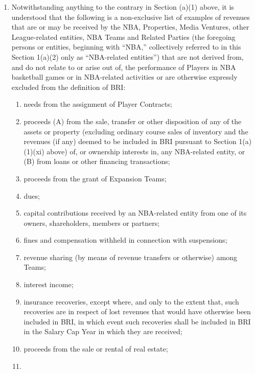 \documentclass[
]{book}
\providecommand{\tightlist}{%
  \setlength{\itemsep}{0pt}\setlength{\parskip}{0pt}}
\begin{document}
\begin{enumerate}
\begin{enumerate}
\begin{enumerate}
    \end{enumerate}
  \item
    Notwithstanding anything to the contrary in Section (a)(1) above, it is understood that the following is a non-exclusive list of examples of revenues that are or may be received by the NBA, Properties, Media Ventures, other League-related entities, NBA Teams and Related Parties (the foregoing persons or entities, beginning with ``NBA,'' collectively referred to in this Section 1(a)(2) only as ``NBA-related entities'') that are not derived from, and do not relate to or arise out of, the performance of Players in NBA basketball games or in NBA-related activities or are otherwise expressly excluded from the definition of BRI:

    \begin{enumerate}
    \def\labelenumiii{(\roman{enumiii})}
    \tightlist
    \item
      needs from the assignment of Player Contracts;
    \item
      proceeds (A) from the sale, transfer or other disposition of any of the assets or property (excluding ordinary course sales of inventory and the revenues (if any) deemed to be included in BRI pursuant to Section 1(a)(1)(xi) above) of, or ownership interests in, any NBA-related entity, or (B) from loans or other financing transactions;
    \item
      proceeds from the grant of Expansion Teams;
    \item
      dues;
    \item
      capital contributions received by an NBA-related entity from one of its owners, shareholders, members or partners;
    \item
      fines and compensation withheld in connection with suspensions;
    \item
      revenue sharing (by means of revenue transfers or otherwise) among Teams;
    \item
      interest income;
    \item
      insurance recoveries, except where, and only to the extent that, such recoveries are in respect of lost revenues that would have otherwise been included in BRI, in which event such recoveries shall be included in BRI in the Salary Cap Year in which they are received;
    \item
      proceeds from the sale or rental of real estate;
    \item

\end{enumerate}
\end{enumerate}
\end{enumerate}
\end{document}

